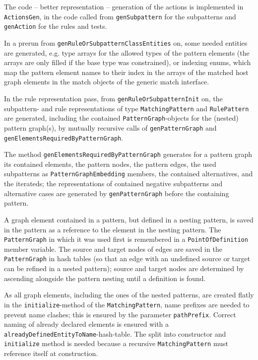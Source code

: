 The code -- better representation -- generation of the actions is implemented in \texttt{ActionsGen}, in the code called from \texttt{gen\-Subpattern} for the subpatterns and \texttt{gen\-Action} for the rules and tests.

In a prerun from \texttt{gen\-Rule\-Or\-Subpattern\-Class\-Entities} on, some needed entities are generated, e.g. type arrays for the allowed types of the pattern elements (the arrays are only filled if the base type was constrained), or indexing enums, which map the pattern element names to their index in the arrays of the matched host graph elements in the match objects of the generic match interface.

In the rule representation pass, from \texttt{gen\-Rule\-Or\-Subpattern\-Init} on, the subpattern- and rule representations of type \texttt{Matching\-Pattern} and \texttt{Rule\-Pattern} are generated, including the contained \texttt{Pattern\-Graph}-objects for the (nested) pattern graph(s), by mutually recursive calls of \texttt{gen\-Pattern\-Graph} and \texttt{gen\-Elements\-Required\-By\-Pattern\-Graph}.

The method \texttt{gen\-Elements\-Required\-By\-Pattern\-Graph} generates for a pattern graph its contained elements, the pattern nodes, the pattern edges, the used subpatterns as \texttt{Pattern\-Graph\-Embedding} members, the contained alternatives, and the iterateds; the representations of contained negative subpatterns and alternative cases are generated by \texttt{gen\-Pattern\-Graph} before the containing pattern. 

A graph element contained in a pattern, but defined in a nesting pattern, is saved in the pattern as a reference to the element in the nesting pattern. 
The \texttt{Pattern\-Graph} in which it was used first is remembered in a \texttt{Point\-Of\-Definition} member variable.
The source and target nodes of edges are saved in the \texttt{Pattern\-Graph} in hash tables (so that an edge with an undefined source or target can be refined in a nested pattern); source and target nodes are determined by ascending alongside the pattern nesting until a definition is found.

As all graph elements, including the ones of the nested patterns, are created flatly in the \texttt{initialize}-method of the \texttt{Matching\-Pattern}, name prefixes are needed to prevent name clashes; this is ensured by the parameter \texttt{path\-Prefix}.
Correct naming of already declared elements is ensured with a \texttt{already\-Defined\-Entity\-To\-Name}-hash-table.
The split into constructor and \texttt{initialize} method is needed because a recursive \texttt{Matching\-Pattern} must reference itself at construction.

